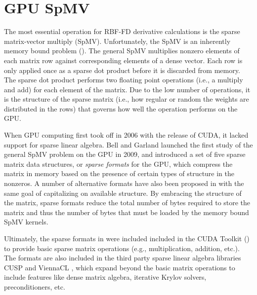 \documentclass{report}
\begin{document}
\fi

\chapter{GPU SpMV}
\label{chap:gpu_rbffd}

The most essential operation for RBF-FD derivative calculations is the sparse matrix-vector multiply (SpMV). 
Unfortunately, the SpMV is an inherently memory bound problem (\cite{Bell2009, SuKeutzer2012, Kreutzer2012}). The general SpMV multiplies nonzero elements of each matrix row against corresponding elements of a dense vector. Each row is only applied once as a sparse dot product before it is discarded from memory. The sparse dot product performs two floating point operations (i.e., a multiply and add) for each element of the matrix. %
Due to the low number of operations, it is the structure of the sparse matrix (i.e., how regular or random the weights are distributed in the rows) that governs how well the operation performs on the GPU. %

When GPU computing first took off in 2006 with the release of CUDA, it lacked support for sparse linear algebra. Bell and Garland \cite{Bell2009} launched the first study of the general SpMV problem on the GPU in 2009, and introduced a set of five sparse matrix data structures, or \emph{sparse formats} for the GPU, which compress the matrix in memory based on the presence of certain types of structure in the nonzeros. 
A number of alternative formats have also been proposed in \cite{SuKeutzer2012,Kreutzer2012,LiSaad2010} with the same goal of capitalizing on available structure.  By embracing the structure of the matrix, sparse formats reduce the total number of bytes required to store the matrix and thus the number of bytes that must be loaded by the memory bound SpMV kernels. 

Ultimately, the sparse formats in \cite{Bell2009} were included included in the CUDA Toolkit (\cite{CudaToolkitDoc}) to provide basic sparse matrix operations (e.g., multiplication, addition, etc.). The formats are also included in the third party sparse linear algebra libraries CUSP \cite{Cusp2012} and ViennaCL \cite{Rupp2010,Rupp2010a}, which expand beyond the basic matrix operations to include features like dense matrix algebra, iterative Krylov solvers, preconditioners, etc. 
\end{document}
